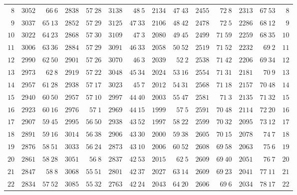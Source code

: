 \begin{GaussVICeresFrame}{.92}
{\begin{tabular}{r@{\GaussVICeresRule}r|r@{\GaussVICeresRule}r|r@{\GaussVICeresRule}r|r@{\GaussVICeresRule}r|r@{\GaussVICeresRule}r|r@{\GaussVICeresRule}r|r@{\GaussVICeresRule}r}
$8$ & $3052$ & $66\ 6$ & $2838$ & $57\ 28$ & $3138$ & $48\ 5$ & $2134$ & $47\ 43$ & $2455$ & $72\ 8$ & $2313$ & $67\ 53$ & $8$ \\
$9$ & $3037$ & $65\ 13$ & $2852$ & $57\ 29$ & $3125$ & $47\ 33$ & $2106$ & $48\ 42$ & $2478$ & $72\ 5$ & $2286$ & $68\ 12$ & $9$ \\
$10$ & $3022$ & $64\ 23$ & $2868$ & $57\ 30$ & $3109$ & $47\ 3$ & $2080$ & $49\ 45$ & $2499$ & $71\ 59$ & $2259$ & $68\ 35$ & $10$ \\[3pt]
$11$ & $3006$ & $63\ 36$ & $2884$ & $57\ 29$ & $3091$ & $46\ 33$ & $2058$ & $50\ 52$ & $2519$ & $71\ 52$ & $2232$ & $69\ 2$ & $11$ \\
$12$ & $2990$ & $62\ 50$ & $2901$ & $57\ 26$ & $3070$ & $46\ 3$ & $2039$ & $52\ 2$ & $2538$ & $71\ 42$ & $2206$ & $69\ 34$ & $12$ \\
$13$ & $2973$ & $62\ 8$ & $2919$ & $57\ 22$ & $3048$ & $45\ 34$ & $2024$ & $53\ 16$ & $2554$ & $71\ 31$ & $2181$ & $70\ 9$ & $13$ \\
$14$ & $2957$ & $61\ 28$ & $2938$ & $57\ 17$ & $3023$ & $45\ 7$ & $2012$ & $54\ 31$ & $2568$ & $71\ 18$ & $2157$ & $70\ 48$ & $14$ \\
$15$ & $2940$ & $60\ 50$ & $2957$ & $57\ 10$ & $2997$ & $44\ 40$ & $2003$ & $55\ 47$ & $2581$ & $71\ 3$ & $2135$ & $71\ 32$ & $15$ \\[3pt]
$16$ & $2923$ & $60\ 16$ & $2976$ & $57\ 1$ & $2969$ & $44\ 15$ & $1999$ & $57\ 5$ & $2591$ & $70\ 48$ & $2114$ & $72\ 20$ & $16$ \\
$17$ & $2907$ & $59\ 45$ & $2995$ & $56\ 50$ & $2938$ & $43\ 52$ & $1997$ & $58\ 22$ & $2599$ & $70\ 32$ & $2095$ & $73\ 12$ & $17$ \\
$18$ & $2891$ & $59\ 16$ & $3014$ & $56\ 38$ & $2906$ & $43\ 30$ & $2000$ & $59\ 38$ & $2605$ & $70\ 15$ & $2078$ & $74\ 7$ & $18$ \\
$19$ & $2876$ & $58\ 51$ & $3033$ & $56\ 24$ & $2873$ & $43\ 10$ & $2006$ & $60\ 52$ & $2608$ & $69\ 58$ & $2063$ & $75\ 6$ & $19$ \\
$20$ & $2861$ & $58\ 28$ & $3051$ & $56\ 8$ & $2837$ & $42\ 53$ & $2015$ & $62\ 5$ & $2609$ & $69\ 40$ & $2051$ & $76\ 7$ & $20$ \\[3pt]
$21$ & $2847$ & $58\ 8$ & $3068$ & $55\ 51$ & $2801$ & $42\ 37$ & $2027$ & $63\ 14$ & $2609$ & $69\ 23$ & $2041$ & $77\ 11$ & $21$ \\
$22$ & $2834$ & $57\ 52$ & $3085$ & $55\ 32$ & $2763$ & $42\ 24$ & $2043$ & $64\ 20$ & $2606$ & $69\ 6$ & $2034$ & $78\ 17$ & $22$ \\

\end{tabular}}
\end{GaussVICeresFrame}
